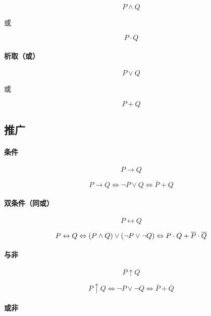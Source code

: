 \documentclass{article}
\begin{document}
\[P\wedge Q\]

或

\[P\cdot Q\]

\paragraph{析取（或）}

\[P\vee Q\]

或

\[P+Q\]

\subsection{推广}

\paragraph{条件}

\[P\rightarrow Q\]

\begin{definition}
    \[P\rightarrow Q
        \Leftrightarrow\neg P \vee Q
        \Leftrightarrow\overline P+Q\]
\end{definition}

\paragraph{双条件（同或）}

\[P\leftrightarrow Q\]

\begin{definition}
    \[P\leftrightarrow Q
        \Leftrightarrow\left(P\wedge Q\right)\vee\left(\neg P \vee\neg Q\right)
        \Leftrightarrow P\cdot Q+\overline P\cdot \overline Q\]
\end{definition}

\paragraph{与非}

\[P\uparrow Q\]

\begin{definition}
    \[P\uparrow Q
        \Leftrightarrow\neg P \vee\neg Q
        \Leftrightarrow\overline P+\overline Q\]
\end{definition}

\paragraph{或非}
\end{document}

